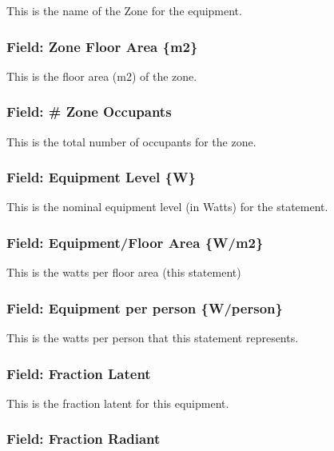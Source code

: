 This is the name of the Zone for the equipment.

\subsubsection{Field: Zone Floor Area \{m2\}}\label{field-zone-floor-area-m2-2}

This is the floor area (m2) of the zone.

\subsubsection{Field: \# Zone Occupants}\label{field-zone-occupants-2}

This is the total number of occupants for the zone.

\subsubsection{Field: Equipment Level \{W\}}\label{field-equipment-level-w}

This is the nominal equipment level (in Watts) for the statement.

\subsubsection{Field: Equipment/Floor Area \{W/m2\}}\label{field-equipmentfloor-area-wm2}

This is the watts per floor area (this statement)

\subsubsection{Field: Equipment per person \{W/person\}}\label{field-equipment-per-person-wperson}

This is the watts per person that this statement represents.

\subsubsection{Field: Fraction Latent}\label{field-fraction-latent}

This is the fraction latent for this equipment.

\subsubsection{Field: Fraction Radiant}\label{field-fraction-radiant-2}

